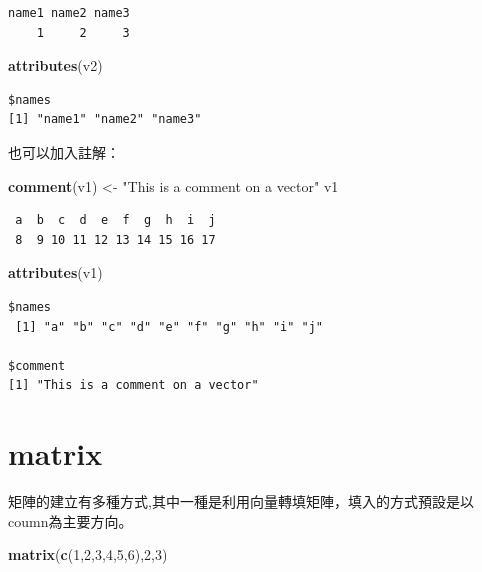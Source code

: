 \documentclass[]{book}
\newenvironment{Shaded}{\begin{snugshade}}{\end{snugshade}}
\newcommand{\DecValTok}[1]{\textcolor[rgb]{0.00,0.00,0.81}{#1}}
\newcommand{\KeywordTok}[1]{\textcolor[rgb]{0.13,0.29,0.53}{\textbf{#1}}}
\newcommand{\NormalTok}[1]{#1}
\newcommand{\StringTok}[1]{\textcolor[rgb]{0.31,0.60,0.02}{#1}}
\theoremstyle{definition}
\theoremstyle{definition}
\theoremstyle{definition}
\theoremstyle{remark}
\begin{document}
\begin{verbatim}
name1 name2 name3 
    1     2     3 
\end{verbatim}

\begin{Shaded}
\begin{Highlighting}[]
\KeywordTok{attributes}\NormalTok{(v2)}
\end{Highlighting}
\end{Shaded}

\begin{verbatim}
$names
[1] "name1" "name2" "name3"
\end{verbatim}

也可以加入註解：

\begin{Shaded}
\begin{Highlighting}[]
\KeywordTok{comment}\NormalTok{(v1) <-}\StringTok{ "This is a comment on a vector"}
\NormalTok{v1}
\end{Highlighting}
\end{Shaded}

\begin{verbatim}
 a  b  c  d  e  f  g  h  i  j 
 8  9 10 11 12 13 14 15 16 17 
\end{verbatim}

\begin{Shaded}
\begin{Highlighting}[]
\KeywordTok{attributes}\NormalTok{(v1)}
\end{Highlighting}
\end{Shaded}

\begin{verbatim}
$names
 [1] "a" "b" "c" "d" "e" "f" "g" "h" "i" "j"

$comment
[1] "This is a comment on a vector"
\end{verbatim}

\hypertarget{matrix}{%
\section{matrix}\label{matrix}}

矩陣的建立有多種方式,其中一種是利用向量轉填矩陣，填入的方式預設是以coumn為主要方向。

\begin{Shaded}
\begin{Highlighting}[]
\KeywordTok{matrix}\NormalTok{(}\KeywordTok{c}\NormalTok{(}\DecValTok{1}\NormalTok{,}\DecValTok{2}\NormalTok{,}\DecValTok{3}\NormalTok{,}\DecValTok{4}\NormalTok{,}\DecValTok{5}\NormalTok{,}\DecValTok{6}\NormalTok{),}\DecValTok{2}\NormalTok{,}\DecValTok{3}\NormalTok{)}
\end{Highlighting}
\end{Shaded}
\end{document}
